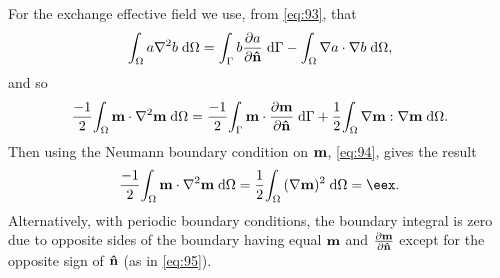 For the exchange effective field we use, from \cref{eq:93}, that
\begin{equation}
  \intd{a \lap  b} = \intb{b \ddn{a}} - \intd{\grad a \cdot \grad b},
\end{equation}
and so
\begin{equation}
  \frac{-1}{2} \intd{\mv \cdot \lap  \mv} = \frac{-1}{2} \intb{\mv \cdot \ddn{\mv}} + \frac{1}{2}  \intd{\grad \mv : \grad \mv}.
\end{equation}
Then using the Neumann boundary condition on $\mv$, \cref{eq:94}, gives the result
\begin{equation}
  \frac{-1}{2} \intd{\mv \cdot \lap \mv} = \frac{1}{2} \intd{(\grad \mv)^2} = \eex.
\end{equation}
Alternatively, with periodic boundary conditions, the boundary integral is zero due to opposite sides of the boundary having equal $\mv$ and $\dmdn$ except for the opposite sign of $\nv$ (as in \cref{eq:95}).



